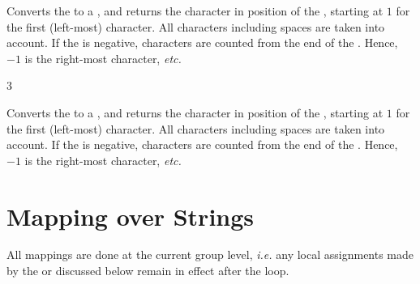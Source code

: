 \documentclass[oneside]{book}
\begin{document}
\begin{function}{\StrItem}
\begin{syntax}
  
\end{syntax}
Converts the  to a ,
and returns the character in position  of
the , starting at $1$ for the first (left-most)
character. All characters including spaces are taken into account.
If the  is negative,
characters are counted from the end of the . Hence,
$-1$ is the right-most character, \emph{etc.}
\begin{demohigh}
 {3}
\end{demohigh}
\end{function}

\begin{function}{\StrVarItem}
\begin{syntax}
  
\end{syntax}
Converts the  to a ,
and returns the character in position  of
the , starting at $1$ for the first (left-most)
character. All characters including spaces are taken into account.
If the  is negative,
characters are counted from the end of the . Hence,
$-1$ is the right-most character, \emph{etc.}
\begin{demohigh}
\StrSet {}
\StrVarItem {}
\end{demohigh}
\end{function}

\section{Mapping over Strings}

All mappings are done at the current group level, \emph{i.e.} any
local assignments made by the  or  discussed
below remain in effect after the loop.

\end{document}
